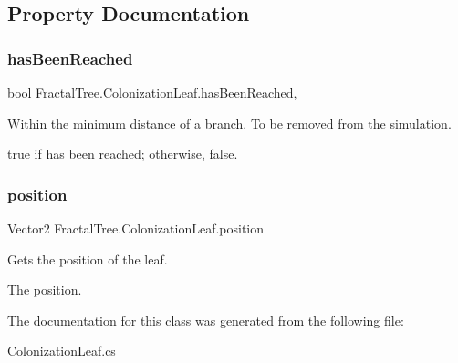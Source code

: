 \subsection{Property Documentation}
\hypertarget{class_fractal_tree_1_1_colonization_leaf_ad45a7ad00f87add9c92cd78047e892aa}{}\label{class_fractal_tree_1_1_colonization_leaf_ad45a7ad00f87add9c92cd78047e892aa} 
\subsubsection{\texorpdfstring{has\+Been\+Reached}{hasBeenReached}}
{\footnotesize\ttfamily bool Fractal\+Tree.\+Colonization\+Leaf.\+has\+Been\+Reached\hspace{0.3cm}{\ttfamily [get]}, {\ttfamily [set]}}



Within the minimum distance of a branch. To be removed from the simulation. 

{\ttfamily true} if has been reached; otherwise, {\ttfamily false}.\hypertarget{class_fractal_tree_1_1_colonization_leaf_a3e33ba00c3c7536f51f7f0c71487a091}{}\label{class_fractal_tree_1_1_colonization_leaf_a3e33ba00c3c7536f51f7f0c71487a091} 
\subsubsection{\texorpdfstring{position}{position}}
{\footnotesize\ttfamily Vector2 Fractal\+Tree.\+Colonization\+Leaf.\+position\hspace{0.3cm}{\ttfamily [get]}}



Gets the position of the leaf. 

The position.

The documentation for this class was generated from the following file\+:\begin{DoxyCompactItemize}
\item 
Colonization\+Leaf.\+cs\end{DoxyCompactItemize}
